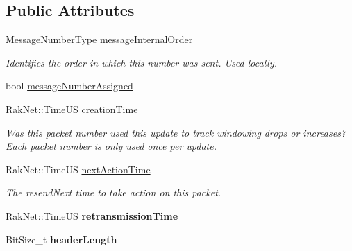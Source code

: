\subsection*{Public Attributes}
\begin{DoxyCompactItemize}
\item 
\hypertarget{struct_rak_net_1_1_internal_packet_ae3e030e8b70b5a72db6357fef8829155}{\hyperlink{namespace_rak_net_a48a622d2efad1d8be8e1fbc5e8e433db}{Message\-Number\-Type} \hyperlink{struct_rak_net_1_1_internal_packet_ae3e030e8b70b5a72db6357fef8829155}{message\-Internal\-Order}}\label{struct_rak_net_1_1_internal_packet_ae3e030e8b70b5a72db6357fef8829155}

\begin{DoxyCompactList}\small\item\em Identifies the order in which this number was sent. Used locally. \end{DoxyCompactList}\item 
bool \hyperlink{struct_rak_net_1_1_internal_packet_a19d5b9586b9fea9af6152705dd031b51}{message\-Number\-Assigned}
\item 
Rak\-Net\-::\-Time\-U\-S \hyperlink{struct_rak_net_1_1_internal_packet_a742b1a6799000754513bd95193b30b09}{creation\-Time}
\begin{DoxyCompactList}\small\item\em Was this packet number used this update to track windowing drops or increases? Each packet number is only used once per update. \end{DoxyCompactList}\item 
\hypertarget{struct_rak_net_1_1_internal_packet_a33572c11615de12b81ebaf38aa9dd10c}{Rak\-Net\-::\-Time\-U\-S \hyperlink{struct_rak_net_1_1_internal_packet_a33572c11615de12b81ebaf38aa9dd10c}{next\-Action\-Time}}\label{struct_rak_net_1_1_internal_packet_a33572c11615de12b81ebaf38aa9dd10c}

\begin{DoxyCompactList}\small\item\em The resend\-Next time to take action on this packet. \end{DoxyCompactList}\item 
\hypertarget{struct_rak_net_1_1_internal_packet_a76869c383deae87c12fe5d1b023ae460}{Rak\-Net\-::\-Time\-U\-S {\bfseries retransmission\-Time}}\label{struct_rak_net_1_1_internal_packet_a76869c383deae87c12fe5d1b023ae460}

\item 
\hypertarget{struct_rak_net_1_1_internal_packet_acb2e124d76d5967d7029eaea2d81712c}{Bit\-Size\-\_\-t {\bfseries header\-Length}}\label{struct_rak_net_1_1_internal_packet_acb2e124d76d5967d7029eaea2d81712c}


\end{DoxyCompactItemize}
